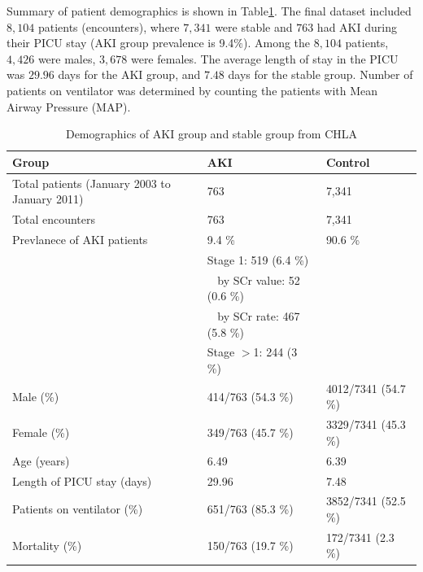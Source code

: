 \documentclass[
   technote
]{phildoc}
\newcommand{\fig}{Fig.}
\newcommand{\tab}{Table}
\begin{document}
Summary of patient demographics is shown in \tab \ref{tab:demographics_chla}. The final dataset included $8,104$ patients (encounters), where $7,341$ were stable and $763$ had AKI during their PICU stay (AKI group prevalence is 9.4$\%$). Among the $8,104$ patients,  $4,426$ were males, $3,678$ were females. The average length of stay in the PICU was $29.96$ days for the AKI group, and $7.48$ days for the stable group. Number of patients on ventilator was determined by counting the patients with Mean Airway Pressure (MAP).

\begin{table}[!htbp] \centering \caption{Demographics of AKI group and stable group from CHLA} \label{tab:demographics_chla}
\begin{tabular}{| l | l | l |}
\hline
\textbf{Group} & \textbf{AKI} & \textbf{Control}\\
\hline \hline
Total patients (January 2003 to January 2011) & 763 & 7,341 \\
\hline
Total encounters	&	763	& 	7,341  \\
\hline
Prevlanece of AKI patients
& 9.4 \% & 90.6 \% \\
& Stage 1: 519 (6.4 \%) & \\
& $\;\;$ by SCr value: 52 (0.6 \%) & \\
& $\;\;$ by SCr rate: 467 (5.8 \%) & \\
& Stage $>$1: 244 (3 \%) & \\
\hline
Male (\%) 			& 	414/763 (54.3 \%)		&	4012/7341 (54.7 \%)	\\
\hline
Female (\%)		&	349/763 (45.7 \%)		&	3329/7341 (45.3 \%)	 \\
\hline
Age (years)		&	6.49 	&	6.39  \\
\hline
Length of PICU stay (days)	& 29.96 &	7.48 \\
\hline
Patients on ventilator (\%) & 651/763 (85.3 \%) & 3852/7341 (52.5 \%) \\
\hline
Mortality (\%) & 150/763 (19.7 \%) & 172/7341 (2.3 \%) \\
\hline
\end{tabular}
\end{table}

\end{document}
